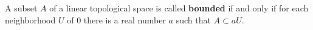 A subset $A$ of a linear topological space is called \textbf{bounded} if and only if for each neighborhood $U$ of $0$ there is a real number $a$ such that $A \subset aU$.
